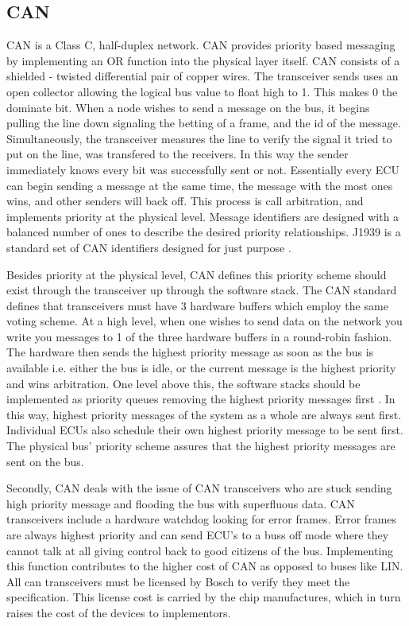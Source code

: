 \documentclass[conference,12pt]{IEEEtran}
\begin{document}
\subsection{CAN} 
CAN is a Class C, half-duplex network. CAN provides priority based messaging by
implementing an OR function into the physical layer itself. CAN consists of
a shielded - twisted differential pair of copper wires.  The
transceiver sends uses an open collector allowing the logical bus value to float
high to 1. This makes 0 the dominate bit.  When a node wishes to send a message
on the bus, it begins pulling the line down signaling the betting of a frame,
and the id of the message. Simultaneously, the transceiver measures the line to
verify the signal it tried to put on the line, was transfered to the receivers.
In this way the sender immediately knows every bit was successfully sent or not.
Essentially every ECU can begin sending a message at the same time, the message
with the most ones wins, and other senders will back off. This process is call
arbitration, and implements priority at the physical level. Message identifiers
are designed with a balanced number of ones to describe the desired priority
relationships. J1939 is a standard set of CAN identifiers designed for just
purpose \autocite{sae_j1939}.

Besides priority at the physical level, CAN defines this priority scheme should
exist through the transceiver up through the software stack.  The CAN standard
defines that transceivers must have 3 hardware buffers which employ the same
voting scheme. At a high level, when one wishes to send data on the network you
write you messages to 1 of the three hardware buffers in a round-robin fashion.
The hardware then sends the highest priority message as soon as the bus is
available i.e. either the bus is idle, or the current message is the highest
priority and wins arbitration. One level above this, the software stacks should
be implemented as priority queues removing the highest priority messages first
\autocite{std_can}.  In this way, highest priority messages of the system as
a whole are always sent first.  Individual ECUs also schedule their own highest
priority message to be sent first. The physical bus' priority scheme assures that
the highest priority messages are sent on the bus.  

Secondly, CAN deals with the issue of CAN transceivers who are stuck sending high
priority message and flooding the bus with superfluous data. CAN transceivers
include a hardware watchdog looking for error frames. Error frames are always
highest priority and can send ECU's to a buss off mode where they cannot talk at
all giving control back to good citizens of the bus. Implementing this function
contributes to the higher cost of CAN as opposed to buses like LIN. All can
transceivers must be licensed by Bosch to verify they meet the specification.
This license cost is carried by the chip manufactures, which in turn raises the
cost of the devices to implementors. 
\end{document}
